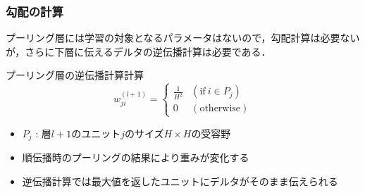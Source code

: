\documentclass[dvipdfmx,11pt,notheorems]{beamer}
\theoremstyle{definition}
\begin{document}
\begin{frame}[fragile]\frametitle{勾配の計算}
プーリング層には学習の対象となるパラメータはないので，勾配計算は必要ない
が，さらに下層に伝えるデルタの逆伝播計算は必要である．

\begin{block}{プーリング層の逆伝播計算計算}
 \begin{equation}
 w_{ji}^{(l+1)} =
	\begin{cases}
    \frac{1}{H^2} & (\text {if}  \  i\in{P_j}) \\
    0 & (\text{otherwise})
  \end{cases}
 \end{equation}
\end{block}

\begin{itemize}
 \item $P_{j}$ : 層$l+1$のユニット$j$のサイズ$H \times H$の受容野
 \item 順伝播時のプーリングの結果により重みが変化する
 \item 逆伝播計算では最大値を返したユニットにデルタがそのまま伝えられる
\end{itemize}

\end{frame}


\end{document}
